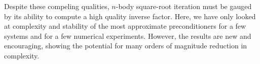 \documentclass[letterpaper,twocolumn,amsmath,amsfont,amssymb,english,aps,jcp,preprintnumbers,groupaddress,nofootinbib,tightenlines,floatfix]{revtex4}
\theoremstyle{plain}
\theoremstyle{remark}
\theoremstyle{plain}
\begin{document}
Despite these compeling qualities, $n$-body square-root iteration must be gauged by its ability to compute 
a high quality inverse factor.   Here, we have only looked at complexity and stability of the most 
approximate preconditioners for a few systems and for a few numerical experiments.  However, the results are 
new and encouraging, showing the potential for  many orders of magnitude reduction in complexity.









%

\end{document}
